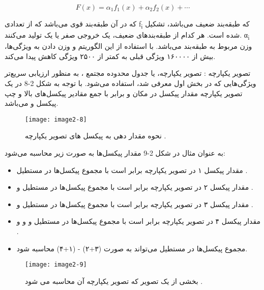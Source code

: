 \begin{equation}\label{eq2-5}
F(x)=α_1 f_1 (x)+α_2 f_2 (x)+⋯
\end{equation}

\noindent
که در آن  طبقه‌بند قوی می‌باشد که از تعدادی f\textsubscript{i} که طبقه‌بند ضعیف می‌باشد، تشکیل شده است. هر کدام از طبقه‌بندهای ضعیف، یک خروجی صفر یا یک تولید می‌کنند. α\textsubscript{i} وزن مربوط به طبقه‌بند می‌باشد. با استفاده از این الگوریتم و وزن دادن به ویژگی‌ها، بیش از ۱۶۰۰۰۰ ویژگی قبلی به کمتر از ۲۵۰۰ ویژگی کاهش پیدا می‌کند.

\noindent
تصویر یکپارچه : تصویر یکپارچه، یا جدول محدوده مجتمع ، به منظور ارزيابی سريع‌تر ویژگی‌هایی که در بخش اول معرفی شد، استفاده می‌شود. با توجه به شکل 2-8 در یک تصویر یکپارچه مقدار پیکسل در مکان  و  برابر با جمع مقادیر پیکسل‌های بالا و چپ پیکسل  و  می‌باشد.

\begin{figure}[h]
\centering
  \texttt{[image: image2-8]}
  \caption{نحوه مقدار دهی به پیکسل های تصویر یکپارچه \cite{ref1}.}
  \label{image2-8}
\end{figure}

\noindent
به عنوان مثال در شکل 2-9 مقدار پیکسل‌ها به صورت زیر محاسبه می‌شود:
\begin{itemize}
\item
مقدار پیکسل ۱ در تصویر یکپارچه برابر است با مجموع پیکسل‌ها در مستطیل .
 \item
مقدار پیکسل ۲ در تصویر یکپارچه برابر است با مجموع پیکسل‌ها در مستطیل  و .
 \item
مقدار پیکسل ۳ در تصویر یکپارچه برابر است با مجموع پیکسل‌ها در مستطیل  و .
 \item
مقدار پیکسل ۴ در تصویر یکپارچه برابر است با مجموع پیکسل‌ها در مستطیل  و  و  و .
\item
مجموع پیکسل‌ها در مستطیل  می‌تواند به صورت (۳+۲) - (۱+۴) محاسبه شود.

\end{itemize} 


\begin{figure}[h]
\centering
  \texttt{[image: image2-9]}
  \caption{بخشی از یک تصویر که تصویر یکپارچه آن محاسبه می شود \cite{ref1}.}
  \label{image2-9}
\end{figure}

